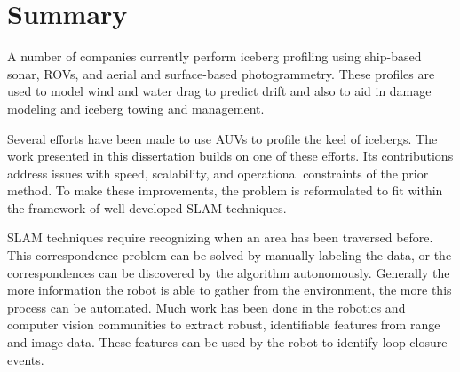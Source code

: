 \section{Summary}

A number of companies currently perform iceberg profiling using ship-based sonar, ROVs, and aerial and surface-based photogrammetry. These profiles are used to model wind and water drag to predict drift and also to aid in damage modeling and iceberg towing and management. 

Several efforts have been made to use AUVs to profile the keel of icebergs. The work presented in this dissertation builds on one of these efforts. Its contributions address issues with speed, scalability, and operational constraints of the prior method. To make these improvements, the problem is reformulated to fit within the framework of well-developed SLAM techniques. 

SLAM techniques require recognizing when an area has been traversed before. This correspondence problem can be solved by manually labeling the data, or the correspondences can be discovered by the algorithm autonomously. Generally the more information the robot is able to gather from the environment, the more this process can be automated. Much work has been done in the robotics and computer vision communities to extract robust, identifiable features from range and image data. These features can be used by the robot to identify loop closure events.

